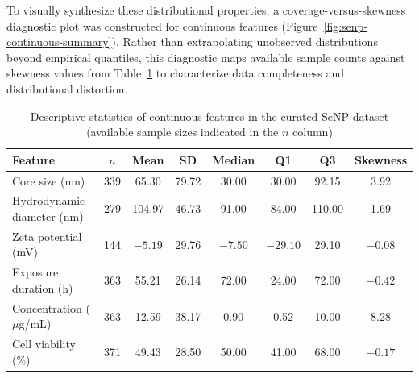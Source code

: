 To visually synthesize these distributional properties, a coverage-versus-skewness diagnostic plot was constructed for continuous features (Figure~\ref{fig:senp-continuous-summary}). Rather than extrapolating unobserved distributions beyond empirical quantiles, this diagnostic maps available sample counts against skewness values from Table~\ref{tab:senp_feature_statistics} to characterize data completeness and distributional distortion.

\begin{table}[H]
  \centering
  \caption{Descriptive statistics of continuous features in the curated SeNP dataset (available sample sizes indicated in the $n$ column)}
  \label{tab:senp_feature_statistics}
  \begin{tabular}{lccccccc}
    \hline
    Feature & $n$ & Mean & SD & Median & Q1 & Q3 & Skewness \\
    \hline
    Core size (nm)               & 339 & 65.30  & 79.72  & 30.00  & 30.00  & 92.15   & 3.92  \\
    Hydrodynamic diameter (nm)   & 279 & 104.97 & 46.73  & 91.00  & 84.00  & 110.00  & 1.69  \\
    Zeta potential (mV)          & 144 & $-5.19$ & 29.76  & $-7.50$ & $-29.10$ & 29.10 & $-0.08$ \\
    Exposure duration (h)        & 363 & 55.21  & 26.14  & 72.00  & 24.00  & 72.00   & $-0.42$ \\
    Concentration ($\mu$g/mL)    & 363 & 12.59  & 38.17  & 0.90   & 0.52   & 10.00   & 8.28  \\
    Cell viability (\%)          & 371 & 49.43  & 28.50  & 50.00  & 41.00  & 68.00   & $-0.17$ \\
    \hline
  \end{tabular}
\end{table}

